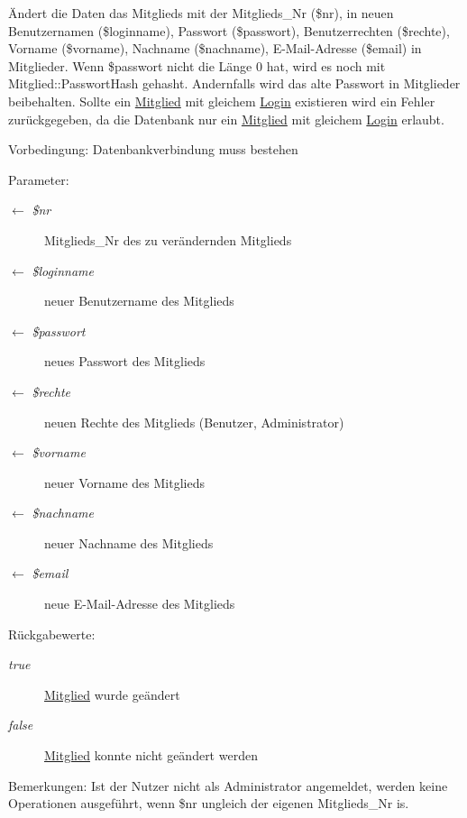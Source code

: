 Ändert die Daten das Mitglieds mit der Mitglieds\_\-Nr (\$nr), in neuen Benutzernamen (\$loginname), Passwort (\$passwort), Benutzerrechten (\$rechte), Vorname (\$vorname), Nachname (\$nachname), E-Mail-Adresse (\$email) in Mitglieder. Wenn \$passwort nicht die Länge 0 hat, wird es noch mit Mitglied::Passwort\-Hash gehasht. Andernfalls wird das alte Passwort in Mitglieder beibehalten. Sollte ein \hyperlink{classMitglied}{Mitglied} mit gleichem \hyperlink{classLogin}{Login} existieren wird ein Fehler zurückgegeben, da die Datenbank nur ein \hyperlink{classMitglied}{Mitglied} mit gleichem \hyperlink{classLogin}{Login} erlaubt. \begin{Desc}
\item[Vorbedingung:]Datenbankverbindung muss bestehen \end{Desc}
\begin{Desc}
\item[Parameter:]
\begin{description}
\item[\mbox{$\leftarrow$} {\em \$nr}]Mitglieds\_\-Nr des zu verändernden Mitglieds \item[\mbox{$\leftarrow$} {\em \$loginname}]neuer Benutzername des Mitglieds \item[\mbox{$\leftarrow$} {\em \$passwort}]neues Passwort des Mitglieds \item[\mbox{$\leftarrow$} {\em \$rechte}]neuen Rechte des Mitglieds (Benutzer, Administrator) \item[\mbox{$\leftarrow$} {\em \$vorname}]neuer Vorname des Mitglieds \item[\mbox{$\leftarrow$} {\em \$nachname}]neuer Nachname des Mitglieds \item[\mbox{$\leftarrow$} {\em \$email}]neue E-Mail-Adresse des Mitglieds \end{description}
\end{Desc}
\begin{Desc}
\item[R\"{u}ckgabewerte:]
\begin{description}
\item[{\em true}]\hyperlink{classMitglied}{Mitglied} wurde geändert \item[{\em false}]\hyperlink{classMitglied}{Mitglied} konnte nicht geändert werden \end{description}
\end{Desc}
\begin{Desc}
\item[Bemerkungen:]Ist der Nutzer nicht als Administrator angemeldet, werden keine Operationen ausgeführt, wenn \$nr ungleich der eigenen Mitglieds\_\-Nr is. \end{Desc}


